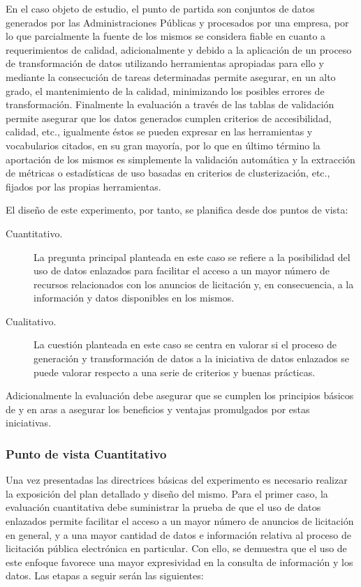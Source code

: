 En el caso objeto de estudio, el punto de partida son conjuntos de datos generados por las Administraciones Públicas y procesados por una empresa, por lo que parcialmente la fuente de los mismos se considera 
fiable en cuanto a requerimientos de calidad, adicionalmente y debido a la aplicación de un proceso de transformación de datos utilizando 
herramientas apropiadas para ello y mediante la consecución de tareas determinadas permite asegurar, en un alto grado, el mantenimiento 
de la calidad, minimizando los posibles errores de transformación. Finalmente la evaluación a través de las tablas de validación permite asegurar que los datos generados 
cumplen criterios de accesibilidad, calidad, etc., igualmente éstos se pueden expresar en las herramientas y vocabularios 
citados, en su gran mayoría, por lo que en último término la aportación de los mismos es simplemente la validación automática y la extracción de métricas 
o estadísticas de uso basadas en criterios de clusterización, etc., fijados por las propias herramientas. 

El diseño de este experimento, por tanto, se planifica desde dos puntos de vista:
\begin{description}
 \item [Cuantitativo.] La pregunta principal planteada en este caso se refiere a la posibilidad del uso de datos enlazados para 
facilitar el acceso a un mayor número de recursos relacionados con los anuncios de licitación y, en consecuencia, a la información 
y datos disponibles en los mismos.
\item [Cualitativo.] La cuestión planteada en este caso se centra en valorar si el proceso de generación y transformación de datos 
a la iniciativa de datos enlazados se puede valorar respecto a una serie de criterios y buenas prácticas.
\end{description}

Adicionalmente la evaluación debe asegurar que se cumplen los principios básicos de \linkeddata y \opendata en aras a asegurar 
los beneficios y ventajas promulgados por estas iniciativas.

\subsubsection{Punto de vista Cuantitativo}
Una vez presentadas las directrices básicas del experimento es necesario realizar la exposición del plan detallado 
y diseño del mismo. Para el primer caso, la evaluación cuantitativa debe suministrar la prueba de que el uso de datos 
enlazados permite facilitar el acceso a un mayor número de anuncios de licitación en general, y a una mayor cantidad de datos 
e información relativa al proceso de licitación pública electrónica en particular. Con ello, se demuestra que el uso de este 
enfoque favorece una mayor expresividad en la consulta de información y los datos. Las etapas a seguir serán las siguientes:

